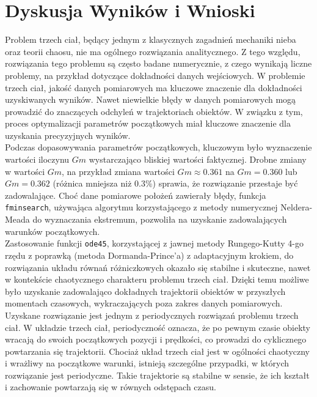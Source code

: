 \documentclass[a4paper, 12pt, twoside, openany]{article}
\begin{document}
	\newpage
	
	\section{Dyskusja Wyników i Wnioski}

	Problem trzech ciał, będący jednym z klasycznych zagadnień mechaniki nieba oraz teorii chaosu, nie ma ogólnego rozwiązania analitycznego. Z tego względu, rozwiązania tego problemu są często badane numerycznie, z czego wynikają liczne problemy, na przykład dotyczące dokładności danych wejściowych. 
	W problemie trzech ciał, jakość danych pomiarowych ma kluczowe znaczenie dla dokładności uzyskiwanych wyników. Nawet niewielkie błędy w danych pomiarowych mogą prowadzić do znaczących odchyleń w trajektoriach obiektów. W związku z tym, proces optymalizacji parametrów początkowych miał kluczowe znaczenie dla uzyskania precyzyjnych wyników. \\
	
	\noindent
	Podczas dopasowywania parametrów początkowych, kluczowym było wyznaczenie wartości iloczynu $Gm$ wystarczająco bliskiej wartości faktycznej. Drobne zmiany w wartości $Gm$, na przykład zmiana wartości $Gm \approx 0.361$ na $Gm = 0.360$ lub $Gm = 0.362$ (różnica mniejsza niż $0.3\%$) sprawia, że rozwiązanie przestaje być zadowalające. Choć dane pomiarowe położeń zawierały błędy, funkcja \texttt{fminsearch}, używająca algorytmu korzystającego z metody numerycznej Neldera-Meada do wyznaczania ekstremum, pozwoliła na uzyskanie zadowalających warunków początkowych. \\
	
	\noindent
	Zastosowanie funkcji \texttt{ode45}, korzystającej z jawnej metody Rungego-Kutty 4-go rzędu z poprawką (metoda Dormanda-Prince'a) z adaptacyjnym krokiem, do rozwiązania układu równań różniczkowych okazało się stabilne i skuteczne, nawet w kontekście chaotycznego charakteru problemu trzech ciał. Dzięki temu możliwe było uzyskanie zadowalająco dokładnych trajektorii obiektów w przyszłych momentach czasowych, wykraczających poza zakres danych pomiarowych. \\
	
	\noindent
	Uzyskane rozwiązanie jest jednym z periodycznych rozwiązań problemu trzech ciał.
	W układzie trzech ciał, periodyczność oznacza, że po pewnym czasie obiekty wracają do swoich początkowych pozycji i prędkości, co prowadzi do cyklicznego powtarzania się trajektorii. Chociaż układ trzech ciał jest w ogólności chaotyczny i wrażliwy na początkowe warunki, istnieją szczególne przypadki, w których rozwiązanie jest periodyczne. Takie trajektorie są stabilne w sensie, że ich kształt i zachowanie powtarzają się w równych odstępach czasu.
\end{document}
